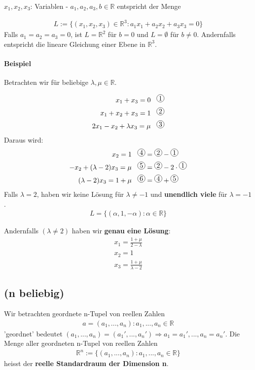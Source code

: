 \documentclass[11pt]{report}
\newcommand*\mycirc[1]{%
  \begin{tikzpicture}
    \node[draw,circle,inner sep=1pt] {#1};
  \end{tikzpicture}}
\newcommand*\Zb[1] {\mathbb{#1}}
\begin{document}
$x_1, x_2, x_3$: Variablen - $a_1, a_2, a_3, b \in \Zb{R}$
entspricht der Menge

\begin{align}
L := \{(x_1,x_2,x_3) \in \Zb{R}^{3}: a_1 x_1 + a_2 x_2 + a_3 x_3 = 0\}
\end{align}
Falls $a_1=a_2=a_3=0$, ist $L=\Zb{R}^{2}$ für $b=0$ und $L=\emptyset$ für $b \neq 0$. Andernfalls entspricht die
lineare Gleichung einer Ebene in $\Zb{R}^{3}$.

\paragraph{Beispiel}
Betrachten wir für beliebige $\lambda, \mu \in \Zb{R}$.

\begin{align}
x_1 + x_3 = 0 \hspace*{0.3cm}\mycirc{1}\\
x_1 + x_2 + x_3 = 1 \hspace*{0.3cm}\mycirc{2}\\
2x_1 - x_2 + \lambda x_3 = \mu \hspace*{0.3cm}\mycirc{3}
\end{align}
Daraus wird:
\begin{align}
                     x_2 = 1 \hspace*{0.3cm}\mycirc{4} &= \mycirc{2} - \mycirc{1}\\
-x_2 + (\lambda-2) x_3 = \mu \hspace*{0.3cm}\mycirc{5} &= \mycirc{2} - 2\cdot\mycirc{1} \\
   (\lambda-2) x_3 = 1 + \mu \hspace*{0.3cm}\mycirc{6} &= \mycirc{4} + \mycirc{5} 
\end{align}
Falls $\lambda=2$, haben wir keine Lösung für $\lambda \neq -1$ und \textbf{unendlich viele} für $\lambda = -1$.
\begin{align}
L = \{(\alpha, 1, -\alpha): \alpha \in \Zb{R}\}
\end{align}

Andernfalls $(\lambda \neq 2)$ haben wir \textbf{genau eine Lösung}:
\begin{align}
x_1 = \frac{1+\mu}{2-\lambda} \\
x_2 = 1 \\
x_3 = \frac{1+\mu}{\lambda-2}
\end{align}

\subsection{(n beliebig)}
Wir betrachten geordnete n-Tupel von reellen Zahlen
\begin{align}
a = (a_1,...,a_n):a_1, ..., a_n \in \Zb{R}
\end{align}
'geordnet' bedeutet $(a_1,...,a_n) = (a_1',...,a_n') \Rightarrow a_1 = a_1', ... , a_n = a_n'$.
Die Menge aller geordneten n-Tupel von reellen Zahlen
\begin{align}
\Zb{R}^{n} := \{(a_1, ..., a_n) : a_1, ..., a_n \in \Zb{R}\}
\end{align}
heisst der \textbf{reelle Standardraum der Dimension n}.
\end{document}
